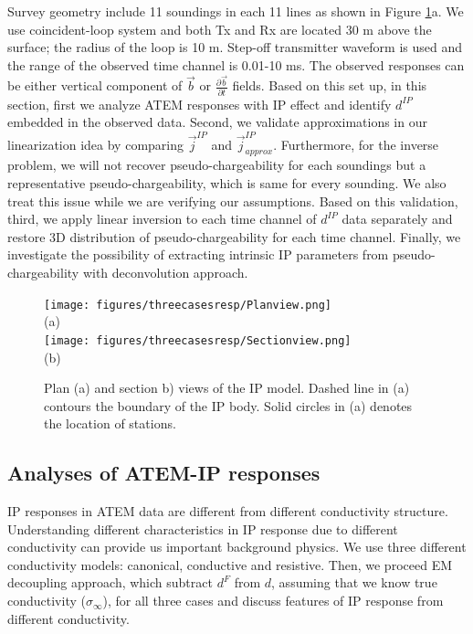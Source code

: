 \documentclass[a4paper, 11pt]{article}
\newcommand{\siginf}{\sigma_\infty}
\renewcommand {\j}  { {\vec j} }
\renewcommand {\b}  { {\vec b} }
\newcommand{\dip}{d^{IP}}
\begin{document}
Survey geometry include 11 soundings in each 11 lines as shown in Figure \ref{F: IPModel}a. We use coincident-loop system and both Tx and Rx are located 30 m above the surface; the radius of the loop is 10 m. Step-off transmitter waveform is used and the range of the observed time channel is 0.01-10 ms. The observed responses can be either vertical component of $\b$ or $\frac{\partial \b}{\partial t}$ fields. Based on this set up, in this section, first we analyze ATEM responses with IP effect and identify $\dip$ embedded in the observed data. Second, we validate approximations in our linearization idea by comparing $\j^{IP}$ and $\j^{IP}_{approx}$. Furthermore, for the inverse problem, we will not recover pseudo-chargeability for each soundings but a representative pseudo-chargeability, which is same for every sounding. We also treat this issue while we are verifying our assumptions. 
Based on this validation, third, we apply linear inversion to each time channel of $\dip$ data separately and restore 3D distribution of pseudo-chargeability for each time channel. Finally, we investigate the possibility of extracting intrinsic IP parameters from pseudo-chargeability with deconvolution approach. 

\begin{figure}[htb]
  \centering
  \texttt{[image: figures/threecasesresp/Planview.png]} \\
  (a) \\
  \texttt{[image: figures/threecasesresp/Sectionview.png]} \\
  (b)
  \caption{Plan (a) and section b) views of the IP model. Dashed line in (a) contours the boundary of the IP body. Solid circles in (a) denotes the location of stations.}
  \label{F: IPModel}
\end{figure}
\clearpage

\subsection{Analyses of ATEM-IP responses}
IP responses in ATEM data are different from different conductivity structure. Understanding different characteristics in IP response due to different conductivity can provide us important background physics. We use three different conductivity models: canonical, conductive and resistive. Then,  we proceed EM decoupling approach, which subtract $d^F$ from $d$,  assuming that we know true conductivity ($\siginf$), for all three cases and discuss features of IP response from different conductivity. 
\end{document}
